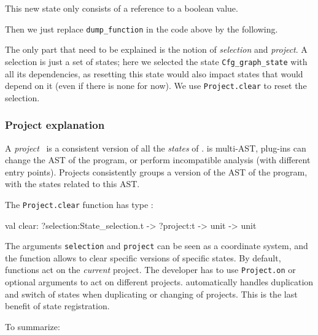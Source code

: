 
This new state only consists of a reference to a boolean value.

Then we just replace \texttt{dump\_function} in the code above by the
following.


The only part that need to be explained is the notion of
\emph{selection} and \emph{project}. A selection is just a set of
states; here we selected the state \texttt{Cfg\_graph\_state} with all
its dependencies, as resetting this state would also impact states
that would depend on it (even if there is none for now). We use
\texttt{Project.clear} to reset the selection.

\subsubsection{Project explanation}

A \emph{project}~\cite{project} is a consistent version of all the \emph{states}
of \framac. \framac is multi-AST, \ie \framac plug-ins can change the AST of the
program, or perform incompatible analysis (\eg with different entry
points). Projects consistently groups a version of the AST of the program, with
the states related to this AST.

The \texttt{Project.clear} function has type :
\begin{ocamlcode}
val clear: ?selection:State_selection.t -> ?project:t -> unit -> unit  
\end{ocamlcode}

The arguments \texttt{selection} and \texttt{project} can be seen as a
coordinate system, and the function allows to clear specific versions
of specific states. By default, \framac functions act on the
\emph{current} project. The developer has to use \texttt{Project.on} or optional
arguments to act on different projects. \framac automatically handles
duplication and switch of states when duplicating or changing of
projects. This is the last benefit of state registration.

To summarize:

